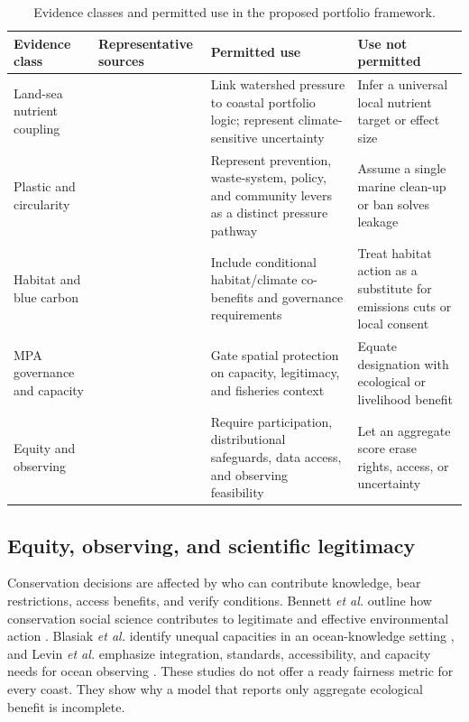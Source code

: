 \documentclass[conference]{IEEEtran}
\begin{document}
\begin{table}[t]
\caption{Evidence classes and permitted use in the proposed portfolio framework.}
\label{tab:evidence}
\centering
\renewcommand{\arraystretch}{1.15}
\begin{tabular}{|p{}|p{}|p{}|p{}|}
\hline
\textbf{Evidence class} & \textbf{Representative sources} & \textbf{Permitted use} & \textbf{Use not permitted} \\
\hline
Land-sea nutrient coupling & \cite{paerl2009,malone2020,reusch2018} & Link watershed pressure to coastal portfolio logic; represent climate-sensitive uncertainty & Infer a universal local nutrient target or effect size \\
\hline
Plastic and circularity & \cite{kumar2021} & Represent prevention, waste-system, policy, and community levers as a distinct pressure pathway & Assume a single marine clean-up or ban solves leakage \\
\hline
Habitat and blue carbon & \cite{hilmi2021} & Include conditional habitat/climate co-benefits and governance requirements & Treat habitat action as a substitute for emissions cuts or local consent \\
\hline
MPA governance and capacity & \cite{mccay2011,bennett2013,gill2017} & Gate spatial protection on capacity, legitimacy, and fisheries context & Equate designation with ecological or livelihood benefit \\
\hline
Equity and observing & \cite{bennettsocial2017,blasiak2020,levin2019} & Require participation, distributional safeguards, data access, and observing feasibility & Let an aggregate score erase rights, access, or uncertainty \\
\hline
\end{tabular}
\end{table}

\subsection{Equity, observing, and scientific legitimacy}

Conservation decisions are affected by who can contribute knowledge, bear restrictions, access benefits, and verify conditions. Bennett \emph{et al.} outline how conservation social science contributes to legitimate and effective environmental action \cite{bennettsocial2017}. Blasiak \emph{et al.} identify unequal capacities in an ocean-knowledge setting \cite{blasiak2020}, and Levin \emph{et al.} emphasize integration, standards, accessibility, and capacity needs for ocean observing \cite{levin2019}. These studies do not offer a ready fairness metric for every coast. They show why a model that reports only aggregate ecological benefit is incomplete.
\end{document}
